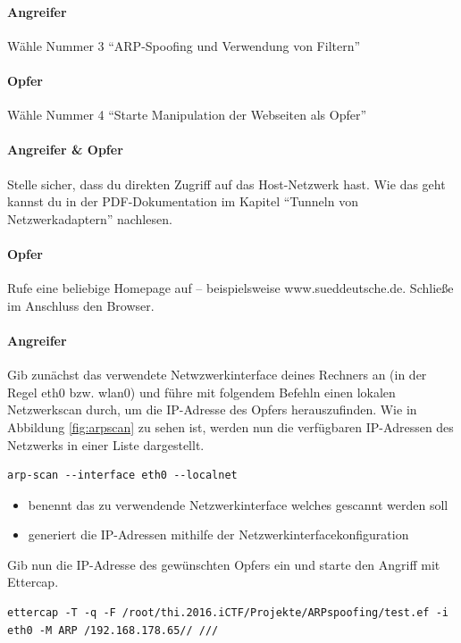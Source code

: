 \paragraph{Angreifer} Wähle Nummer 3 \enquote{ARP-Spoofing und Verwendung von Filtern}

\paragraph{Opfer} Wähle Nummer 4 \enquote{Starte Manipulation der Webseiten als Opfer}

\paragraph{Angreifer \& Opfer} Stelle sicher, dass du direkten Zugriff auf das Host-Netzwerk hast. Wie das geht kannst du in der PDF-Dokumentation im Kapitel \enquote{Tunneln von Netzwerkadaptern} nachlesen.

\paragraph{Opfer} Rufe eine beliebige Homepage auf -- beispielsweise www.sueddeutsche.de. Schließe im Anschluss den Browser.

\paragraph{Angreifer} Gib zunächst das verwendete Netwzwerkinterface deines Rechners an (in der Regel eth0 bzw. wlan0) und führe mit folgendem Befehln einen lokalen Netzwerkscan durch, um die IP-Adresse des Opfers herauszufinden. Wie in Abbildung \ref{fig:arpscan} zu sehen ist, werden nun die verfügbaren IP-Adressen des Netzwerks in einer Liste dargestellt.
\begin{lstlisting}
arp-scan --interface eth0 --localnet
\end{lstlisting}

\begin{itemize}
	\item {} benennt das zu verwendende Netzwerkinterface welches gescannt werden soll
	\item {} generiert die IP-Adressen mithilfe der Netzwerkinterfacekonfiguration
\end{itemize}

Gib nun die IP-Adresse des gewünschten Opfers ein und starte den Angriff mit Ettercap.
\begin{lstlisting}
ettercap -T -q -F /root/thi.2016.iCTF/Projekte/ARPspoofing/test.ef -i eth0 -M ARP /192.168.178.65// ///
\end{lstlisting}

